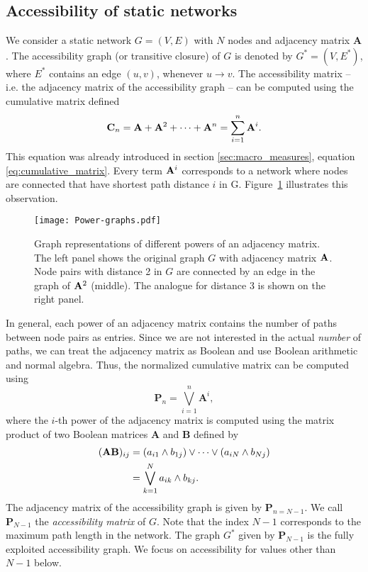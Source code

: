 \subsection{Accessibility of static networks}\label{sec:unfolding_static}
We consider a static network $G=(V,E)$ with $N$ nodes and adjacency matrix $\mathbf{A}$.
The accessibility graph (or transitive closure) of $G$ is denoted by $G^*=(V,E^*)$, where $E^*$ contains an edge $(u,v)$, whenever $u\rightarrow v$.
The accessibility matrix -- i.e. the adjacency matrix of the accessibility graph -- can be computed using the cumulative matrix defined
\begin{equation}\label{eq:cumulative_matrix2}
\mathbf{C}_n=\mathbf{A}+\mathbf{A}^2+\cdots + \mathbf{A}^n = \sum _{i=1} ^n \mathbf{A}^i .
\end{equation}
This equation was already introduced in section \ref{sec:macro_measures}, equation \eqref{eq:cumulative_matrix}.
Every term $\mathbf{A}^i$ corresponds to a network where nodes are connected that have shortest path distance $i$ in G.
Figure~\ref{fig:power_graphs} illustrates this observation.
%
\begin{SCfigure}
\texttt{[image: Power-graphs.pdf]}
\caption{Graph representations of different powers of an adjacency matrix.
The left panel shows the original graph $G$ with adjacency matrix $\mathbf{A}$.
Node pairs with distance 2 in $G$ are connected by an edge in the graph of $\mathbf{A}^2$ (middle).
The analogue for distance 3 is shown on the right panel.}
\label{fig:power_graphs}
\end{SCfigure}

In general, each power of an adjacency matrix contains the number of paths between node pairs as entries.
Since we are not interested in the actual \emph{number} of paths, we can treat the adjacency matrix as Boolean and use Boolean arithmetic and normal algebra.
Thus, the normalized cumulative matrix can be computed using
\begin{equation}\label{eq:static_boolean_acc}
\mathbf{P}_{n}=\bigvee _{i=1} ^{n} \mathbf{A}^i ,
\end{equation}
where the $i$-th power of the adjacency matrix is computed using the matrix product of two Boolean matrices $\mathbf{A}$ and $\mathbf{B}$ defined by 
\begin{align}\label{eq:boolean_product}
(\mathbf{A}\mathbf{B})_{ij}&=(a_{i1}\wedge b_{1j})\vee \dots \vee(a_{iN}\wedge b_{Nj}) \nonumber \\
&= \bigvee _{k=1}^N a_{ik} \wedge b_{kj} .
\end{align}
The adjacency matrix of the accessibility graph is given by $\mathbf{P}_{n=N-1}$.
We call $\mathbf{P}_{N-1}$ the \emph{accessibility matrix} of $G$.
Note that the index $N-1$ corresponds to the maximum path length in the network.
The graph $G^*$ given by $\mathbf{P}_{N-1}$ is the fully exploited accessibility graph.
We focus on accessibility for values other than $N-1$ below.

